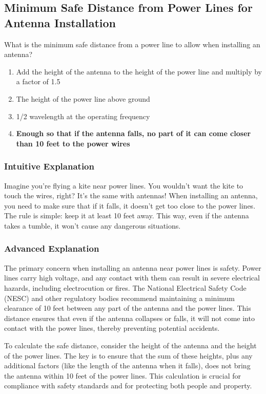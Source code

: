 \subsection{Minimum Safe Distance from Power Lines for Antenna Installation}
\label{T0B06}

\begin{tcolorbox}[colback=gray!10!white,colframe=black!75!black,title=T0B06]
What is the minimum safe distance from a power line to allow when installing an antenna?
\begin{enumerate}[label=\Alph*)]
    \item Add the height of the antenna to the height of the power line and multiply by a factor of 1.5
    \item The height of the power line above ground
    \item 1/2 wavelength at the operating frequency
    \item \textbf{Enough so that if the antenna falls, no part of it can come closer than 10 feet to the power wires}
\end{enumerate}
\end{tcolorbox}

\subsubsection{Intuitive Explanation}
Imagine you're flying a kite near power lines. You wouldn't want the kite to touch the wires, right? It's the same with antennas! When installing an antenna, you need to make sure that if it falls, it doesn't get too close to the power lines. The rule is simple: keep it at least 10 feet away. This way, even if the antenna takes a tumble, it won't cause any dangerous situations.

\subsubsection{Advanced Explanation}
The primary concern when installing an antenna near power lines is safety. Power lines carry high voltage, and any contact with them can result in severe electrical hazards, including electrocution or fires. The National Electrical Safety Code (NESC) and other regulatory bodies recommend maintaining a minimum clearance of 10 feet between any part of the antenna and the power lines. This distance ensures that even if the antenna collapses or falls, it will not come into contact with the power lines, thereby preventing potential accidents.

To calculate the safe distance, consider the height of the antenna and the height of the power lines. The key is to ensure that the sum of these heights, plus any additional factors (like the length of the antenna when it falls), does not bring the antenna within 10 feet of the power lines. This calculation is crucial for compliance with safety standards and for protecting both people and property.

